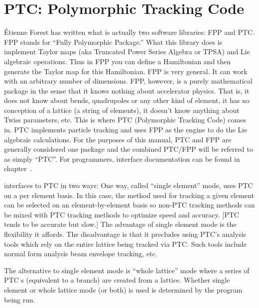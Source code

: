 \section{PTC: Polymorphic Tracking Code}
\label{s:ptc.intro}

\'Etienne Forest\cite{b:forest} has written what is actually two software libraries: FPP and PTC.
FPP stands for ``Fully Polymorphic Package.'' What this library does is implement Taylor maps (aka
Truncated Power Series Algebra or TPSA) and Lie algebraic operations. Thus in FPP you can define a
Hamiltonian and then generate the Taylor map for this Hamiltonian. FPP is very general. It can work
with an arbitrary number of dimensions.  FPP, however, is a purely mathematical package in the sense
that it knows nothing about accelerator physics. That is, it does not know about bends, quadrupoles
or any other kind of element, it has no conception of a lattice (a string of elements), it doesn't
know anything about Twiss parameters, etc. This is where PTC (Polymorphic Tracking Code) comes
in. PTC implements particle tracking and uses FPP as the engine to do the Lie algebraic
calculations.  For the purposes of this manual, PTC and FPP are generally considered one package and
the combined PTC/FPP will be referred to as simply ``PTC''.  For programmers, interface
documentation can be found in chapter~.

\bmad interfaces to PTC in two ways: One way, called ``single element'' mode, uses PTC on a per
element basis. In this case, the method used for tracking a given element can be selected on an
element-by-element basis so non-PTC tracking methods can be mixed with PTC tracking methods to
optimize speed and accuracy. [PTC tends to be accurate but slow.] The advantage of single element
mode is the flexibility it affords. The disadvantage is that it precludes using PTC's analysis tools
which rely on the entire lattice being tracked via PTC. Such tools include normal form analysis beam
envelope tracking, etc.

The alternative to single element mode is ``whole lattice'' mode where a series of PTC s
(equivalent to a \bmad branch) are created from a \bmad lattice. Whether single element or whole
lattice mode (or both) is used is determined by the program being run.

